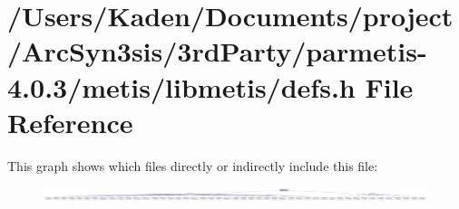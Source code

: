 \hypertarget{a00888}{}\section{/\+Users/\+Kaden/\+Documents/project/\+Arc\+Syn3sis/3rd\+Party/parmetis-\/4.0.3/metis/libmetis/defs.h File Reference}
\label{a00888}
This graph shows which files directly or indirectly include this file\+:\nopagebreak
\begin{figure}[H]
\begin{center}
\leavevmode
\includegraphics[width=350pt]{a00890}
\end{center}
\end{figure}
